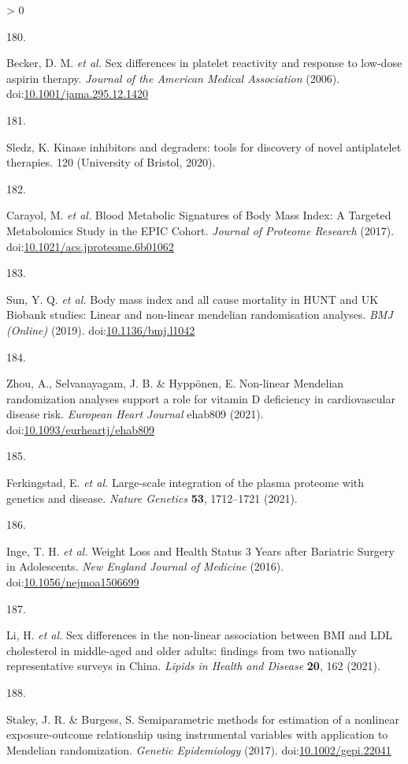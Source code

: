 \documentclass[11pt,twoside]{bristolthesis}
\newlength{\cslhangindent}
\newlength{\csllabelwidth}
\newenvironment{CSLReferences}[2] %
 {%
  \setlength{\parindent}{0pt}
  \ifodd #1 \everypar{\setlength{\hangindent}{\cslhangindent}}\ignorespaces\fi
  \ifnum #2 > 0
  \setlength{\parskip}{#2\baselineskip}
  \fi
 }%
 {}
\newcommand{\CSLLeftMargin}[1]{\parbox[t]{\csllabelwidth}{#1}}
\newcommand{\CSLRightInline}[1]{\parbox[t]{\linewidth - \csllabelwidth}{#1}\break}
\begin{document}
\begin{CSLReferences}{0}{0}
\leavevmode\hypertarget{ref-Becker2006}{}%
\CSLLeftMargin{180. }
\CSLRightInline{Becker, D. M. \emph{et al.} {Sex differences in platelet reactivity and response to low-dose aspirin therapy}. \emph{Journal of the American Medical Association} (2006). doi:\href{https://doi.org/10.1001/jama.295.12.1420}{10.1001/jama.295.12.1420}}

\leavevmode\hypertarget{ref-Sledz2020}{}%
\CSLLeftMargin{181. }
\CSLRightInline{Sledz, K. {Kinase inhibitors and degraders: tools for discovery of novel antiplatelet therapies}. 120 (University of Bristol, 2020).}

\leavevmode\hypertarget{ref-Carayol2017c}{}%
\CSLLeftMargin{182. }
\CSLRightInline{Carayol, M. \emph{et al.} {Blood Metabolic Signatures of Body Mass Index: A Targeted Metabolomics Study in the EPIC Cohort}. \emph{Journal of Proteome Research} (2017). doi:\href{https://doi.org/10.1021/acs.jproteome.6b01062}{10.1021/acs.jproteome.6b01062}}

\leavevmode\hypertarget{ref-Sun2019}{}%
\CSLLeftMargin{183. }
\CSLRightInline{Sun, Y. Q. \emph{et al.} {Body mass index and all cause mortality in HUNT and UK Biobank studies: Linear and non-linear mendelian randomisation analyses}. \emph{BMJ (Online)} (2019). doi:\href{https://doi.org/10.1136/bmj.l1042}{10.1136/bmj.l1042}}

\leavevmode\hypertarget{ref-Zhou2021}{}%
\CSLLeftMargin{184. }
\CSLRightInline{Zhou, A., Selvanayagam, J. B. \& Hyppönen, E. {Non-linear Mendelian randomization analyses support a role for vitamin D deficiency in cardiovascular disease risk}. \emph{European Heart Journal} ehab809 (2021). doi:\href{https://doi.org/10.1093/eurheartj/ehab809}{10.1093/eurheartj/ehab809}}

\leavevmode\hypertarget{ref-Ferkingstad2021}{}%
\CSLLeftMargin{185. }
\CSLRightInline{Ferkingstad, E. \emph{et al.} {Large-scale integration of the plasma proteome with genetics and disease}. \emph{Nature Genetics} \textbf{53}, 1712--1721 (2021).}

\leavevmode\hypertarget{ref-Inge2016}{}%
\CSLLeftMargin{186. }
\CSLRightInline{Inge, T. H. \emph{et al.} {Weight Loss and Health Status 3 Years after Bariatric Surgery in Adolescents}. \emph{New England Journal of Medicine} (2016). doi:\href{https://doi.org/10.1056/nejmoa1506699}{10.1056/nejmoa1506699}}

\leavevmode\hypertarget{ref-Li2021}{}%
\CSLLeftMargin{187. }
\CSLRightInline{Li, H. \emph{et al.} {Sex differences in the non-linear association between BMI and LDL cholesterol in middle-aged and older adults: findings from two nationally representative surveys in China}. \emph{Lipids in Health and Disease} \textbf{20}, 162 (2021).}

\leavevmode\hypertarget{ref-Staley2017}{}%
\CSLLeftMargin{188. }
\CSLRightInline{Staley, J. R. \& Burgess, S. {Semiparametric methods for estimation of a nonlinear exposure-outcome relationship using instrumental variables with application to Mendelian randomization}. \emph{Genetic Epidemiology} (2017). doi:\href{https://doi.org/10.1002/gepi.22041}{10.1002/gepi.22041}}

\end{CSLReferences}
\end{document}
